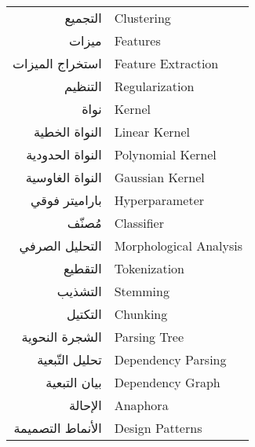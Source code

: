 \begin{doublespacing}
\begin{center}
\begin{longtable}{r l}
			
			التجميع		& 			\textenglish{Clustering}				\\
			
			
			ميزات			& 				\textenglish{Features}				\\
			
			
			استخراج الميزات		& 				\textenglish{Feature Extraction}				\\
			
			
			التنظيم		& 			\textenglish{Regularization}	\\
			
			
			نواة		& 			\textenglish{Kernel}	\\
			
			النواة الخطية		& 			\textenglish{Linear Kernel}		\\
			
			النواة الحدودية		& 			\textenglish{Polynomial Kernel}		\\
			
			النواة الغاوسية		& 			\textenglish{Gaussian Kernel}		\\
			
			باراميتر فوقي		& 			\textenglish{Hyperparameter}		\\
			
			مُصنّف	& 			\textenglish{Classifier}		\\
			
			التحليل الصرفي	& 			\textenglish{Morphological Analysis}		\\
			
			التقطيع		& 			\textenglish{Tokenization}		\\
			
			التشذيب	& 			\textenglish{Stemming}		\\
			
			التكتيل		& 			\textenglish{Chunking}		\\
			
			الشجرة النحوية		& 			\textenglish{Parsing Tree}		\\
			
			تحليل التّبعية		& 			\textenglish{Dependency Parsing}		\\
			
			بيان التبعية		& 			\textenglish{Dependency Graph}		\\
			
			الإحالة		& 			\textenglish{Anaphora}		\\
			
			الأنماط التصميمة		& 			\textenglish{Design Patterns}		\\
			
		\end{longtable}
	\end{center}
\end{doublespacing}

